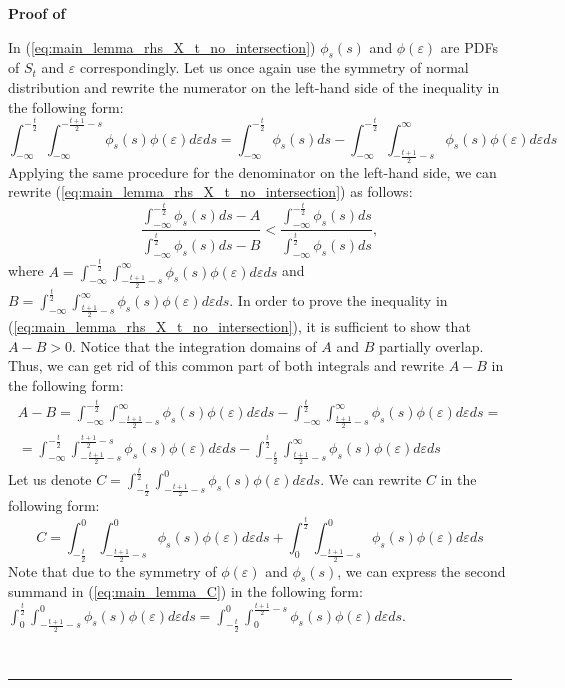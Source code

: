 \documentclass[12pt]{article}
\newenvironment{proof}[1][Proof of]{\noindent\textbf{#1} }{\ \rule{0.5em}{0.5em}}
\begin{document}
\begin{proof}
\begin{enumerate}[label={\roman*})]
In (\ref{eq:main_lemma_rhs_X_t_no_intersection}) $\phi_s(s)$ and $\phi(\varepsilon)$ are PDFs of $S_t$ and $\varepsilon$ correspondingly. Let us once again use the symmetry of normal distribution and rewrite the numerator on the left-hand side of the inequality in the following form:
\begin{equation}
\int_{-\infty}^{-\frac{t}{2}}\int_{-\infty}^{-\frac{t+1}{2}-s}\phi_{s}(s)\phi(\varepsilon)d\varepsilon ds 
= 
\int_{-\infty}^{-\frac{t}{2}}\phi_{s}(s)ds - \int_{-\infty}^{-\frac{t}{2}}\int^{\infty}_{-\frac{t+1}{2}-s}\phi_{s}(s)\phi(\varepsilon)d\varepsilon ds
\end{equation}
Applying the same procedure for the denominator on the left-hand side, we can rewrite (\ref{eq:main_lemma_rhs_X_t_no_intersection}) as follows:
\begin{equation}\label{eq:lemma_main_A_B_1}
\frac{\int_{-\infty}^{-\frac{t}{2}}\phi_{s}(s)ds - A}
{\int_{-\infty}^{\frac{t}{2}}\phi_{s}(s)ds - B}
<
\frac{\int_{-\infty}^{-\frac{t}{2}}\phi_{s}(s)ds}
{\int_{-\infty}^{\frac{t}{2}}\phi_{s}(s)ds}, 
\end{equation}
where $A = \int_{-\infty}^{-\frac{t}{2}}\int^{\infty}_{-\frac{t+1}{2}-s}\phi_{s}(s)\phi(\varepsilon)d\varepsilon ds$ and $B = \int_{-\infty}^{\frac{t}{2}}\int^{\infty}_{\frac{t+1}{2}-s}\phi_{s}(s)\phi(\varepsilon)d\varepsilon ds$. In order to prove the inequality in (\ref{eq:main_lemma_rhs_X_t_no_intersection}), it is sufficient to show that $A-B > 0$. Notice that the integration domains of $A$ and $B$ partially overlap. Thus, we can get rid of this common part of both integrals and rewrite $A-B$ in the following form:
\begin{equation}\label{eq:main_lemma_A_B}
	\begin{aligned}
A-B = \int_{-\infty}^{-\frac{t}{2}}\int^{\infty}_{-\frac{t+1}{2}-s}\phi_{s}(s)\phi(\varepsilon)d\varepsilon ds
-
\int_{-\infty}^{\frac{t}{2}}\int^{\infty}_{\frac{t+1}{2}-s}\phi_{s}(s)\phi(\varepsilon)d\varepsilon ds = \\
=
\int_{-\infty}^{-\frac{t}{2}}\int_{-\frac{t+1}{2}-s}^{\frac{t+1}{2}-s}\phi_{s}(s)\phi(\varepsilon)d\varepsilon ds
-
\int_{-\frac{t}{2}}^{\frac{t}{2}}\int^{\infty}_{\frac{t+1}{2}-s}\phi_{s}(s)\phi(\varepsilon)d\varepsilon ds
	\end{aligned}
\end{equation}
Let us denote $C = \int_{-\frac{t}{2}}^{\frac{t}{2}}\int_{-\frac{t+1}{2}-s}^{0}\phi_{s}(s)\phi(\varepsilon)d\varepsilon ds$. We can rewrite $C$ in the following form:
\begin{equation}\label{eq:main_lemma_C}
C = \int_{-\frac{t}{2}}^{0}\int_{-\frac{t+1}{2}-s}^{0}\phi_{s}(s)\phi(\varepsilon)d\varepsilon ds 
+ 
\int_{0}^{\frac{t}{2}}\int_{-\frac{t+1}{2}-s}^{0}\phi_{s}(s)\phi(\varepsilon)d\varepsilon ds 
\end{equation}
Note that due to the symmetry of $\phi(\varepsilon)$ and $\phi_s(s)$, we can express the second summand in (\ref{eq:main_lemma_C}) in the following form: $\int_{0}^{\frac{t}{2}}\int_{-\frac{t+1}{2}-s}^{0}\phi_{s}(s)\phi(\varepsilon)d\varepsilon ds = \int_{-\frac{t}{2}}^{0}\int_{0}^{\frac{t+1}{2}-s}\phi_{s}(s)\phi(\varepsilon)d\varepsilon ds$.


\end{enumerate}
\end{proof}
\end{document}
